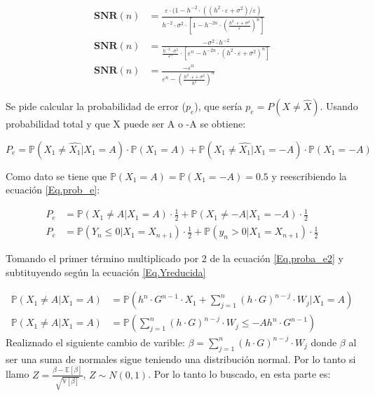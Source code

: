 			\begin{align*}
				\textbf{SNR}(n) &= \frac{\varepsilon \cdot (1- h^{-2} \cdot \left( (h^2 \cdot \varepsilon + \sigma ^2 ) / \varepsilon \right) }{h^{-2} \cdot \sigma ^2 \cdot \left[ 1- h^{-2n} \cdot \left( \frac{h^2 \cdot \varepsilon + \sigma ^2}{\varepsilon} \right) ^n \right]} \\
				\textbf{SNR}(n) &= \frac{- \sigma ^2 \cdot h^{-2}}{\frac{h^{-2} \cdot \sigma ^2}{\varepsilon ^n} \cdot [\varepsilon ^n - h^{-2n} \cdot (h^2 \cdot \varepsilon + \sigma ^2)^n]} \\
				\textbf{SNR}(n) &= \frac{- \varepsilon ^n}{\varepsilon ^n - \left( \frac{h^2 \cdot \varepsilon + \sigma ^2}{h^2} \right) ^n}			
			\end{align*}
	
\indent Se pide calcular la probabilidad de error ($p_e$), que sería $p_e = P(X \neq \widehat{X})$. Usando probabilidad total y que X puede ser A o -A se obtiene:

			\begin{equation}
				P_e = \mathbb{P}(X_1 \neq \widehat{X_1} | X_1 = A) \cdot \mathbb{P}(X_1 =A) + \mathbb{P} (X_1 \neq \widehat{X_1} | X_1 = -A) \cdot \mathbb{P}(X_1 = -A)
				\label{Eq.prob_e}
			\end{equation}

\indent	Como dato se tiene que $\mathbb{P}(X_1 = A) = \mathbb{P}(X_1 = -A) = 0.5$ y reescribiendo la ecuación \ref{Eq.prob_e}:

			\begin{align}
				P_e &= \mathbb{P}(X_1 \neq A | X_1 = A) \cdot \frac{1}{2} + \mathbb{P} (X_1 \neq -A | X_1 = -A) \cdot \frac{1}{2} \\
				P_e &= \mathbb{P}(Y_n \leq 0 | X_1 = X_{n+1}) \cdot \frac{1}{2} + \mathbb{P} (y_n > 0 | X_1 = X_{n+1}) \cdot \frac{1}{2} 
				\label{Eq.proba_e2}
			\end{align}

\indent Tomando el primer término multiplicado por 2 de la ecuación \ref{Eq.proba_e2} y subtituyendo según la ecuación \ref{Eq.Yreducida}
			
			\begin{align*}
				\mathbb{P}(X_1 \neq A | X_1 = A) &= \mathbb{P}\left( h^n \cdot G^{n-1} \cdot X_1 + \sum_{j=1}^{n}(h \cdot G)^{n-j} \cdot W_j |X_1=A \right)	\\
				\mathbb{P}(X_1 \neq A | X_1 = A) &= \mathbb{P} \left( \sum_{j=1}^{n} (h \cdot G)^{n-j} \cdot W_j \leq -A h^n \cdot G^{n-1} \right)		
			\end{align*}
\indent Realiznado el siguiente cambio de varible: $\beta = \sum_{j=1}^{n} (h \cdot G)^{n-j} \cdot W_j$ donde $\beta$	al ser una suma de normales sigue teniendo una distribución normal. Por lo tanto si llamo $Z= \frac{\beta - \mathbb{E}[\beta]}{\sqrt{\mathbb{V}[\beta]}}$, $Z \sim N(0,1)$. Por lo tanto lo buscado, en esta parte es:

